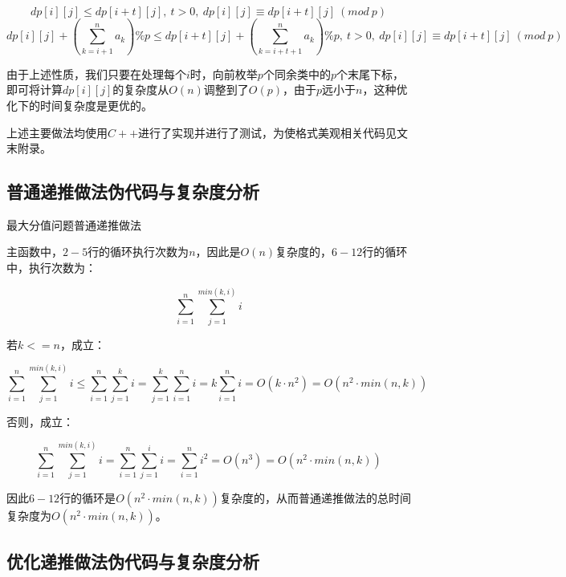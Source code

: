 \documentclass{article}
\begin{document}
$$
dp[i][j]\le{dp}[i+t][j],\ t>0,\  dp[i][j]\equiv{dp}[i+t][j]\ (mod\ p)
$$
$$
dp[i][j]+(\sum_{k=i+1}^n{a_k})\%p\le{dp}[i+t][j]+(\sum_{k=i+t+1}^n{a_k})\%p,\ t>0,\  dp[i][j]\equiv{dp}[i+t][j]\ (mod\ p)
$$

由于上述性质，我们只要在处理每个$i$时，向前枚举$p$个同余类中的$p$个末尾下标，即可将计算$dp[i][j]$的复杂度从$O(n)$调整到了$O(p)$，由于$p$远小于$n$，这种优化下的时间复杂度是更优的。

上述主要做法均使用$C++$进行了实现并进行了测试，为使格式美观相关代码见文末附录。

\subsection{普通递推做法伪代码与复杂度分析}

\begin{algorithm}[H]

\caption{最大分值问题普通递推做法}
\LinesNumbered
{}


\end{algorithm}

主函数中，$2-5$行的循环执行次数为$n$，因此是$O(n)$复杂度的，$6-12$行的循环中，执行次数为：

$$
\sum_{i=1}^n\sum_{j=1}^{min(k,i)}i
$$

若$k<=n$，成立：

$$
\sum_{i=1}^n\sum_{j=1}^{min(k,i)}i\le\sum_{i=1}^n\sum_{j=1}^{k}i=\sum_{j=1}^{k}\sum_{i=1}^ni=k\sum_{i=1}^ni=O(k\cdot{n^2})=O(n^2\cdot{min}(n,k))
$$

否则，成立：

$$
\sum_{i=1}^n\sum_{j=1}^{min(k,i)}i=\sum_{i=1}^n\sum_{j=1}^ii=\sum_{i=1}^n i^2=O(n^3)=O(n^2\cdot{min}(n,k))
$$

因此$6-12$行的循环是$O(n^2\cdot{min}(n,k))$复杂度的，从而普通递推做法的总时间复杂度为$O(n^2\cdot{min}(n,k))$。

\subsection{优化递推做法伪代码与复杂度分析}
\end{document}
